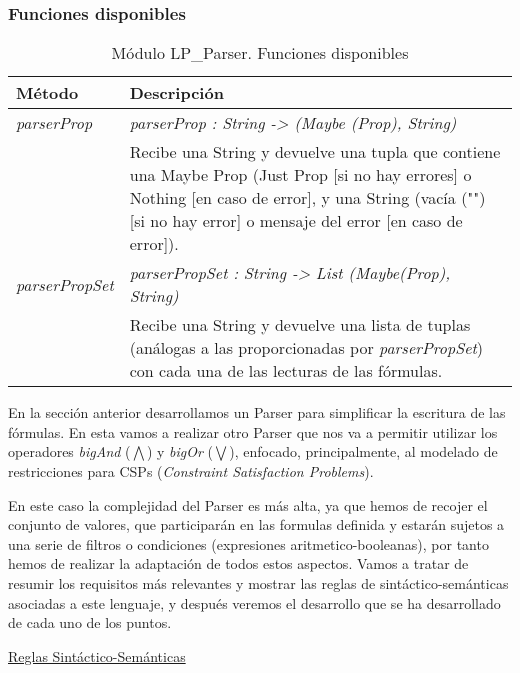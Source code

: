 \documentclass[a4paper]{report}
\begin{document}
\subsubsection{Funciones disponibles}

\begin{table}[H]
\centering
\begin{tabular}{p{3cm} p{13.2cm}}
\hline
Método & Descripción\\
\hline
\hline
\textit{parserProp}& \textit{parserProp : String -> (Maybe (Prop), String)}\\
& Recibe una String y devuelve una tupla que contiene una Maybe Prop (Just Prop [si no hay errores] o Nothing [en caso de error], y una String (vacía ("") [si no hay error] o mensaje del error [en caso de error]).\\
\hline
\textit{parserPropSet}& \textit{parserPropSet : String -> List (Maybe(Prop), String)}\\
& Recibe una String y devuelve una lista de tuplas (análogas a las proporcionadas por \textit{parserPropSet}) con cada una de las lecturas de las fórmulas.\\
\hline
\end{tabular}
\caption{Módulo LP\_Parser. Funciones disponibles}
\end{table}

En la sección anterior desarrollamos un Parser para simplificar la escritura de las fórmulas. En esta vamos a realizar otro Parser que nos va a permitir utilizar los operadores \textit{bigAnd} ($\bigwedge$) y \textit{bigOr} ($\bigvee$), enfocado, principalmente, al modelado de restricciones para CSPs (\textit{Constraint Satisfaction Problems}).

En este caso la complejidad del Parser es más alta, ya que hemos de recojer el conjunto de valores, que participarán en las formulas definida y estarán sujetos a una serie de filtros o condiciones (expresiones aritmetico-booleanas), por tanto hemos de realizar la adaptación de todos estos aspectos. Vamos a tratar de resumir los requisitos más relevantes y mostrar las reglas de sintáctico-semánticas asociadas a este lenguaje, y después veremos el desarrollo que se ha desarrollado de cada uno de los puntos.

\noindent\underline{Reglas Sintáctico-Semánticas}
\end{document}
